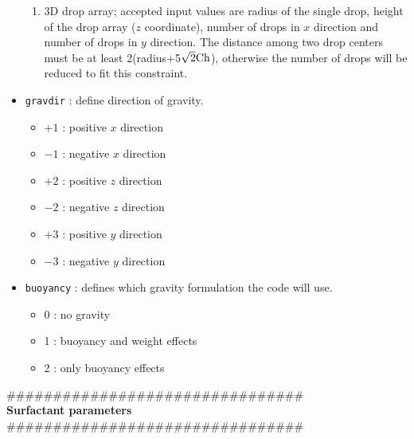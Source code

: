 \begin{itemize}[label={$\circ$}]
\begin{enumerate}
\item 3D drop array; accepted input values are radius of the single drop, height of the drop array ($z$ coordinate), number of drops in $x$ direction and number of drops in $y$ direction. The distance among two drop centers must be at least 2(radius+5$\sqrt{2}\textnormal{Ch}$), otherwise the number of drops will be reduced to fit this constraint.
\end{enumerate}
\item \texttt{gravdir} : define direction of gravity.
\begin{itemize}[label={$\circ$}]
\item $+1$ : positive $x$ direction
\item $-1$ : negative $x$ direction
\item $+2$ : positive $z$ direction
\item $-2$ : negative $z$ direction
\item $+3$ : positive $y$ direction
\item $-3$ : negative $y$ direction
\end{itemize}
\item \texttt{buoyancy} : defines which gravity formulation the code will use.
\begin{itemize}[label={$\circ$}]
\item 0 : no gravity
\item 1 : buoyancy and weight effects
\item 2 : only buoyancy effects
\end{itemize}
\end{itemize}
\#\#\#\#\#\#\#\#\#\#\#\#\#\#\#\#\#\#\#\#\#\#\#\#\#\#\#\#\#\#\#\#\\
{\bf Surfactant parameters}\\
\#\#\#\#\#\#\#\#\#\#\#\#\#\#\#\#\#\#\#\#\#\#\#\#\#\#\#\#\#\#\#\#

